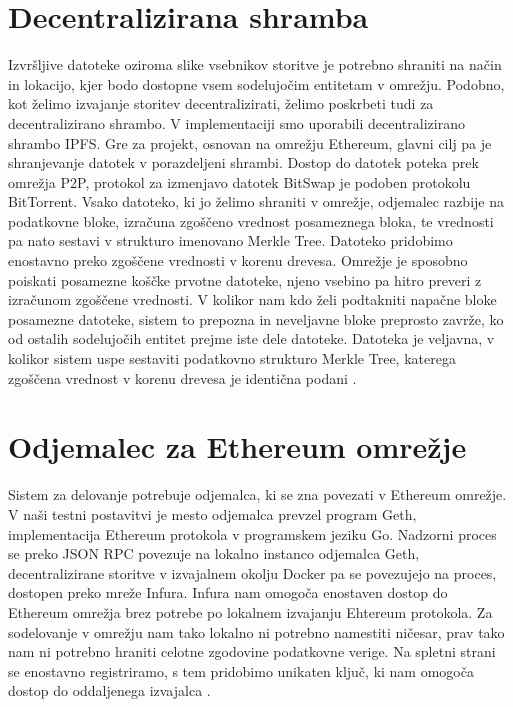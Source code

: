 \documentclass[a4paper, 12pt]{book}
\begin{document}
\section{Decentralizirana shramba}
Izvršljive datoteke oziroma slike vsebnikov storitve je potrebno shraniti na način in lokacijo, kjer bodo dostopne vsem sodelujočim entitetam v omrežju.
Podobno, kot želimo izvajanje storitev decentralizirati, želimo poskrbeti tudi za decentralizirano shrambo.
V implementaciji smo uporabili decentralizirano shrambo IPFS.
Gre za projekt, osnovan na omrežju Ethereum, glavni cilj pa je shranjevanje datotek v porazdeljeni shrambi.
Dostop do datotek poteka prek omrežja P2P, protokol za izmenjavo datotek BitSwap je podoben protokolu BitTorrent.
Vsako datoteko, ki jo želimo shraniti v omrežje, odjemalec razbije na podatkovne bloke, izračuna zgoščeno vrednost posameznega bloka, te vrednosti pa nato sestavi v strukturo imenovano Merkle Tree.
Datoteko pridobimo enostavno preko zgoščene vrednosti v korenu drevesa.
Omrežje je sposobno poiskati posamezne koščke prvotne datoteke, njeno vsebino pa hitro preveri z izračunom zgoščene vrednosti. V kolikor nam kdo želi podtakniti napačne bloke posamezne datoteke, sistem to prepozna in neveljavne bloke preprosto zavrže, ko od ostalih sodelujočih entitet prejme iste dele datoteke. Datoteka je veljavna, v kolikor sistem uspe sestaviti podatkovno strukturo Merkle Tree, katerega zgoščena vrednost v korenu drevesa je identična podani \cite{Ipfs}.

\section{Odjemalec za Ethereum omrežje}
Sistem za delovanje potrebuje odjemalca, ki se zna povezati v Ethereum omrežje.
V naši testni postavitvi je mesto odjemalca prevzel program Geth, implementacija Ethereum protokola v programskem jeziku Go. \cite{Geth}
Nadzorni proces se preko JSON RPC povezuje na lokalno instanco odjemalca Geth, decentralizirane storitve v izvajalnem okolju Docker pa se 
povezujejo na proces, dostopen preko mreže Infura.
Infura nam omogoča enostaven dostop do Ethereum omrežja brez potrebe po lokalnem izvajanju Ehtereum protokola.
Za sodelovanje v omrežju nam tako lokalno ni potrebno namestiti ničesar, prav tako nam ni potrebno hraniti
celotne zgodovine podatkovne verige. 
Na spletni strani se enostavno registriramo, s tem pridobimo unikaten ključ, ki nam omogoča dostop do oddaljenega izvajalca \cite{Infura}.
\end{document}
